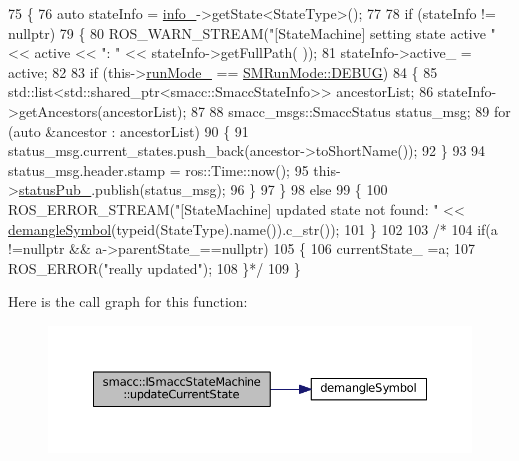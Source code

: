 \begin{DoxyCode}
75 \{
76     \textcolor{keyword}{auto} stateInfo = \hyperlink{classsmacc_1_1ISmaccStateMachine_a5ec3201cbddab4f062f572fb33021041}{info\_}->getState<StateType>();
77 
78     \textcolor{keywordflow}{if} (stateInfo != \textcolor{keyword}{nullptr})
79     \{
80         ROS\_WARN\_STREAM(\textcolor{stringliteral}{"[StateMachine] setting state active "} << active << \textcolor{stringliteral}{": "} << stateInfo->getFullPath(
      ));
81         stateInfo->active\_ = active;
82 
83         \textcolor{keywordflow}{if} (this->\hyperlink{classsmacc_1_1ISmaccStateMachine_a9f8cfbf577f7ae7a48b7a328e2e6b589}{runMode\_} == \hyperlink{namespacesmacc_a3e4f79486ea6ea6342dd3c712d16a4f6adc30ec20708ef7b0f641ef78b7880a15}{SMRunMode::DEBUG})
84         \{
85             std::list<std::shared\_ptr<smacc::SmaccStateInfo>> ancestorList;
86             stateInfo->getAncestors(ancestorList);
87 
88             smacc\_msgs::SmaccStatus status\_msg;
89             \textcolor{keywordflow}{for} (\textcolor{keyword}{auto} &ancestor : ancestorList)
90             \{
91                 status\_msg.current\_states.push\_back(ancestor->toShortName());
92             \}
93 
94             status\_msg.header.stamp = ros::Time::now();
95             this->\hyperlink{classsmacc_1_1ISmaccStateMachine_a7360ef485d5c83a3811dfe3eaa3a0c20}{statusPub\_}.publish(status\_msg);
96         \}
97     \}
98     \textcolor{keywordflow}{else}
99     \{
100         ROS\_ERROR\_STREAM(\textcolor{stringliteral}{"[StateMachine] updated state not found: "} << 
      \hyperlink{common_8h_a401d7e4f000fd4246a20be1e7d5ec2fc}{demangleSymbol}(\textcolor{keyword}{typeid}(StateType).name()).c\_str());
101     \}
102 
103     \textcolor{comment}{/*  }
104 \textcolor{comment}{        if(a !=nullptr && a->parentState\_==nullptr)}
105 \textcolor{comment}{        \{}
106 \textcolor{comment}{            currentState\_ =a;}
107 \textcolor{comment}{            ROS\_ERROR("really updated");}
108 \textcolor{comment}{        \}*/}
109 \}
\end{DoxyCode}


Here is the call graph for this function\+:
\nopagebreak
\begin{figure}[H]
\begin{center}
\leavevmode
\includegraphics[width=350pt]{classsmacc_1_1ISmaccStateMachine_aea0936b00b0186e8d4e514af16f69766_cgraph}
\end{center}
\end{figure}




